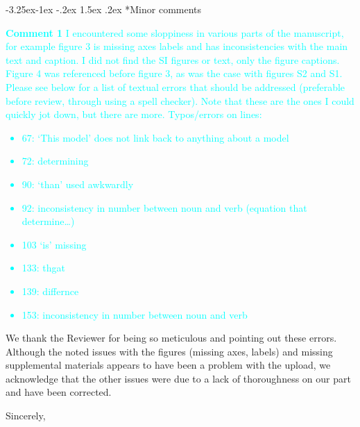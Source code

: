\documentclass[ucm,12pt]{ucletter}
\makeatletter
\newcounter{section}
\newcounter{subsection}[section]
\newcommand\subsection{\@startsection{subsection}{2}{\z@}%
                                     {-3.25ex\@plus -1ex \@minus -.2ex}%
                                     {1.5ex \@plus .2ex}%
                                     {\normalfont\large\bfseries}}
\makeatother
\begin{document}
\begin{letter}
\subsection*{Minor comments}
\noindent \textcolor{cyan}{
{\bf Comment 1} I encountered some sloppiness in various parts of the manuscript, for example figure 3 is missing axes labels and has inconsistencies with the main text and caption. I did not find the SI figures or text, only the figure captions. Figure 4 was referenced before figure 3, as was the case with figures S2 and S1. Please see below for a list of textual errors that should be addressed (preferable before review, through using a spell checker). Note that these are the ones I could quickly jot down, but there are more.
Typos/errors on lines:
\begin{itemize}
\item 67:   ‘This model’ does not link back to anything about a model
\item 72:   determining
\item 90:   ‘than’ used awkwardly
\item 92:   inconsistency in number between noun and verb (equation that determine…)
\item 103  ‘is’ missing
\item 133: thgat
\item 139: differnce
\item 153:  inconsistency in number between noun and verb
\end{itemize}
}

We thank the Reviewer for being so meticulous and pointing out these errors. Although the noted issues with the figures (missing axes, labels) and missing supplemental materials appears to have been a problem with the upload, we acknowledge that the other issues were due to a lack of thoroughness on our part and have been corrected.

\vspace{5mm}

\singlespacing
\closing{Sincerely,\\
\\
}

\end{letter}
\end{document}
